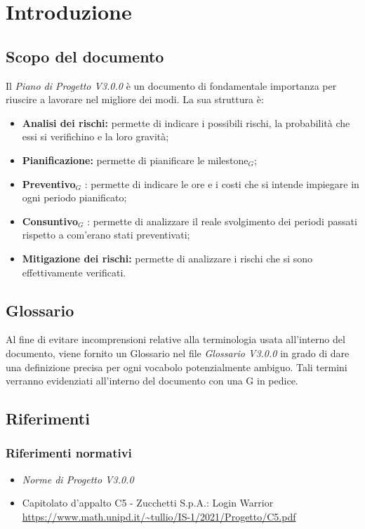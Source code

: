 \chapter{Introduzione}

\section{Scopo del documento}

Il \textit{Piano di Progetto V3.0.0} è un documento di fondamentale importanza per riuscire a lavorare nel migliore dei
modi. La sua struttura è:
\begin{itemize}
    \item \textbf{Analisi dei rischi: } permette di indicare i possibili rischi, la probabilità che essi si verifichino e la loro gravità;
    \item \textbf{Pianificazione: } permette di pianificare le milestone$_G$;
    \item \textbf{Preventivo}$_G$ : permette di indicare le ore e i costi che si intende impiegare in ogni periodo pianificato;
    \item \textbf{Consuntivo}$_G$ : permette di analizzare il reale svolgimento dei periodi passati rispetto a com'erano stati preventivati;
    \item \textbf{Mitigazione dei rischi: } permette di analizzare i rischi che si sono effettivamente verificati.
\end{itemize}

\section{Glossario}
Al fine di evitare incomprensioni relative alla terminologia usata all'interno del documento, viene fornito un Glossario nel file \textit{Glossario V3.0.0} in grado di dare una definizione precisa per ogni vocabolo potenzialmente ambiguo. Tali termini verranno evidenziati all'interno del documento con una G in pedice.

\section{Riferimenti}
\subsection{Riferimenti normativi}
\begin{itemize}
  \item \textit{Norme di Progetto V3.0.0}
  \item Capitolato d'appalto C5 - Zucchetti S.p.A.: Login Warrior \\
  \url{https://www.math.unipd.it/~tullio/IS-1/2021/Progetto/C5.pdf}
\end{itemize}

